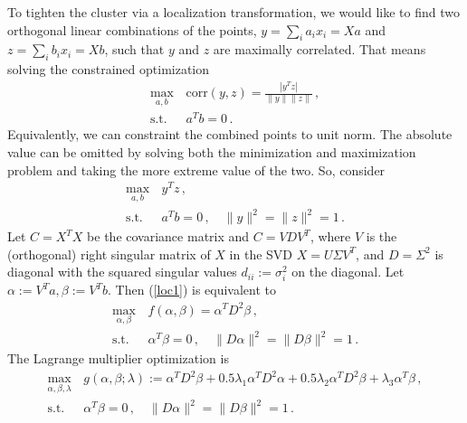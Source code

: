 \documentclass[11pt]{article}
\begin{document}
To tighten the cluster via a localization transformation, we would like to find two orthogonal linear combinations of the points, $y = \sum_i a_i x_i = X a$ and $z = \sum_i b_i x_i = X b$, such that $y$ and $z$ are maximally correlated. That means solving the constrained optimization
\begin{equation}
    \begin{aligned}
       \max_{a,b}\, & \text{corr}(y,z) =  \frac{|y^T z|}{\|y\| \|z\|}\,,\\
        \text{s.t.}\, & a^T b = 0\,.
    \end{aligned}
\end{equation}
Equivalently, we can constraint the combined points to unit norm. The absolute value can be omitted by solving both the minimization and maximization problem and taking the more extreme value of the two. So, consider
\begin{equation}
    \begin{aligned}
       \max_{a,b}\, & y^T z\,,\\
        \text{s.t.}\, & a^T b = 0\,, \quad \|y\|^2 = \|z\|^2 = 1\,.
    \end{aligned}
    \label{loc1}
\end{equation}
Let $C = X^T X$ be the covariance matrix and $C = V D V^T$, where $V$ is the (orthogonal) right singular matrix of $X$ in the SVD $X = U \Sigma V^T$, and $D = \Sigma^2$ is diagonal with the squared singular values $d_{ii} := \sigma_i^2$ on the diagonal. Let $\alpha := V^T a, \beta := V^T b$. Then (\ref{loc1}) is equivalent to
\begin{equation}
    \begin{aligned}
       \max_{\alpha,\beta}\, & f(\alpha,\beta) = \alpha^T D^2 \beta\,,\\
        \text{s.t.}\, & \alpha^T \beta = 0\,, \quad \|D \alpha\|^2 = \|D \beta\|^2 = 1\,.
    \end{aligned}
    \label{loc2}
\end{equation}
The Lagrange multiplier optimization is
\begin{equation}
    \begin{aligned}
       \max_{\alpha,\beta,\lambda}\, & g(\alpha,\beta;\lambda) := \alpha^T D^2 \beta
       + 0.5 \lambda_1 \alpha^T D^2 \alpha + 0.5 \lambda_2 \alpha^T D^2 \beta 
       + \lambda_3 \alpha^T \beta \,,\\
        \text{s.t.}\, & \alpha^T \beta = 0\,, \quad \|D \alpha\|^2 = \|D \beta\|^2 = 1\,.
    \end{aligned}
    \label{loc_lag}
\end{equation}
\end{document}
